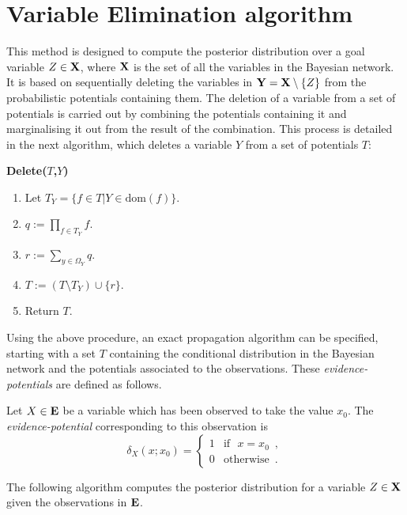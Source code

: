 \section{Variable Elimination algorithm}


This method \cite{Zha96} is designed to compute the posterior
distribution over a goal variable $Z\in \mathbf{X}$, where $\mathbf{X}$ is the
set of all the variables in the Bayesian network. It is based on
sequentially deleting the variables in $\mathbf{Y}=\mathbf{X}\setminus \{ Z\}$
from the probabilistic potentials containing them. The deletion of
a variable from a set of potentials is carried out by combining
the potentials containing it and marginalising it out from the
result of the combination. This process is detailed in the next
algorithm, which deletes a variable $Y$ from a set of potentials
$T$:

\bigskip
\noindent \textsf{\textbf{Delete($T$,$Y$)}}

\begin{enumerate}
  \item Let $T_Y=\{ f\in T | Y\in\mathrm{dom}(f) \}$.
  \item $q:=\prod_{f\in T_Y}f$.
  \item $r:=\sum_{y\in\Omega_Y}q$.
  \item $T:=(T\setminus T_Y)\cup\{ r\}$.
  \item Return $T$.
\end{enumerate}

Using the above procedure, an exact propagation algorithm can be
specified, starting with a set $T$ containing the conditional
distribution in the Bayesian network and the potentials associated
to the observations. These {\em evidence-potentials} are defined
as follows.

\begin{definition}\label{def:evi}
Let $X\in \mathbf{E}$ be a variable which has been observed to take the
value $x_0$. The {\em evidence-potential} corresponding to this
observation is
\begin{equation}
\delta_X(x;x_0)= \left\{ \begin{array}{ll} 1 & \mathrm{if} ~~~
x=x_0 \enspace ,\\
0 & \mathrm{otherwise} \enspace .
\end{array} \right. \label{eq:evi}
\end{equation}
\end{definition}

The following algorithm computes the posterior distribution for a
variable $Z\in\mathbf{X}$ given the observations in $\mathbf{E}$.


